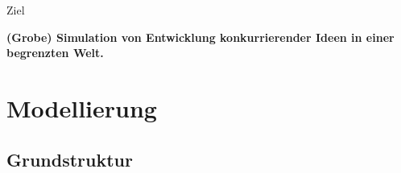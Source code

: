 \section{}
\begin{frame} {Ziel}
	\begin{block}{}
		\textbf{(Grobe) Simulation von Entwicklung konkurrierender Ideen in einer begrenzten Welt.}
	\end{block}
\end{frame}

\section{Modellierung}
\subsection{Grundstruktur}
